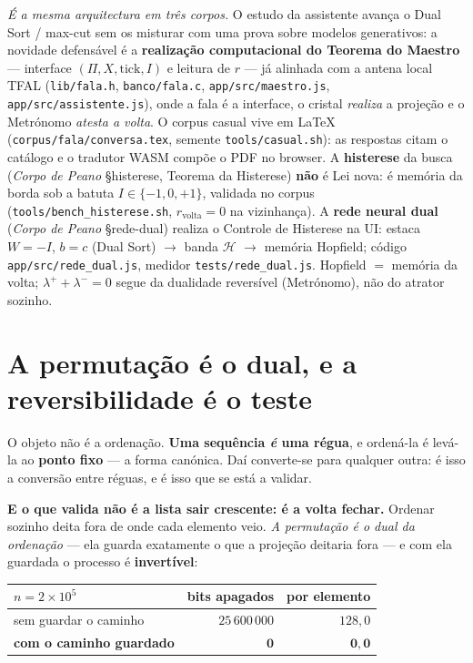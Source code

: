 \documentclass[11pt,a4paper]{article}
\newcommand{\code}[1]{\texttt{\small #1}}
\begin{document}
\noindent \emph{É a mesma arquitectura em três corpos.} O estudo da assistente avança o Dual Sort /
max-cut sem os misturar com uma prova sobre modelos generativos: a novidade defensável é a
\textbf{realização computacional do Teorema do Maestro} --- interface $(\Pi,X,\mathrm{tick},I)$ e
leitura de $r$ --- já alinhada com a antena local TFAL (\code{lib/fala.h}, \code{banco/fala.c},
\code{app/src/maestro.js}, \code{app/src/assistente.js}), onde a fala é a interface, o cristal
\emph{realiza} a projeção e o Metrónomo \emph{atesta a volta}. O corpus casual vive em
\LaTeX{} (\code{corpus/fala/conversa.tex}, semente \code{tools/casual.sh}): as respostas citam o
catálogo e o tradutor WASM compõe o PDF no browser. A \textbf{histerese} da busca
(\emph{Corpo de Peano} \S histerese, Teorema da Histerese) \textbf{não} é Lei nova:
é memória da borda sob a batuta $I\in\{-1,0,+1\}$, validada no corpus
(\code{tools/bench\_histerese.sh}, $r_{\mathrm{volta}}=0$ na vizinhança).
A \textbf{rede neural dual} (\emph{Corpo de Peano} \S rede-dual) realiza o Controle
de Histerese na UI: estaca $W=-I$, $b=c$ (Dual Sort) $\to$ banda $\mathcal{H}$ $\to$
memória Hopfield; código \code{app/src/rede\_dual.js}, medidor
\code{tests/rede\_dual.js}. Hopfield $=$ memória da volta; $\lambda^{+}+\lambda^{-}=0$
segue da dualidade reversível (Metrónomo), não do atrator sozinho.

\section{A permutação é o dual, e a reversibilidade é o teste}

O objeto não é a ordenação. \textbf{Uma sequência \emph{é} uma régua}, e ordená-la é levá-la ao
\textbf{ponto fixo} --- a forma canónica. Daí converte-se para qualquer outra: é isso a conversão
entre réguas, e é isso que se está a validar.

\smallskip
\noindent \textbf{E o que valida não é a lista sair crescente: é a volta fechar.} Ordenar sozinho
deita fora de onde cada elemento veio. \emph{A permutação é o dual da ordenação} --- ela guarda
exatamente o que a projeção deitaria fora --- e com ela guardada o processo é \textbf{invertível}:

\begin{center}\small
\begin{tabular}{@{}lrr@{}}
\toprule
$n=2\times10^{5}$ & bits apagados & por elemento \\
\midrule
sem guardar o caminho & $25\,600\,000$ & $128{,}0$ \\
\textbf{com o caminho guardado} & $\mathbf{0}$ & $\mathbf{0{,}0}$ \\
\bottomrule
\end{tabular}
\end{center}
\end{document}

